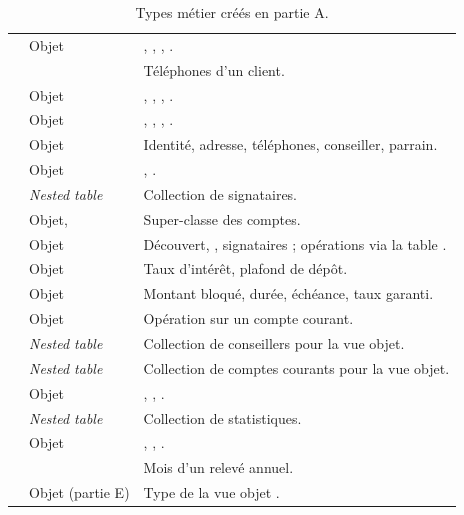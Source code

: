 \begin{table}[htbp]
  \centering
  \small
  \caption{Types métier créés en partie A.}
  \label{tab:types-metier}
  \footnotesize
  \begin{tabularx}{\textwidth}{@{}L{5.4cm}L{3.1cm}X@{}}
    \toprule
     &  &  \\
    \midrule
     & Objet &
    , , , . \\
     &  &
    Téléphones d'un client. \\
     & Objet &
    , , , . \\
     & Objet &
    , , , . \\
     & Objet &
    Identité, adresse, téléphones, conseiller, parrain. \\
     & Objet &
    , . \\
     & \emph{Nested table} &
    Collection de signataires. \\
     & Objet,  &
    Super-classe des comptes. \\
     & Objet  &
    Découvert, , signataires ; opérations via la table
    . \\
     & Objet  &
    Taux d'intérêt, plafond de dépôt. \\
     & Objet  &
    Montant bloqué, durée, échéance, taux garanti. \\
     & Objet &
    Opération sur un compte courant. \\
     & \emph{Nested table} &
    Collection de conseillers pour la vue objet. \\
     & \emph{Nested table} &
    Collection de comptes courants pour la vue objet. \\
     & Objet &
    , , . \\
     & \emph{Nested table} &
    Collection de statistiques. \\
     & Objet &
    , , . \\
     &  &
    Mois d'un relevé annuel. \\
     & Objet (partie E) &
    Type de la vue objet . \\
    \bottomrule
  \end{tabularx}
\end{table}

